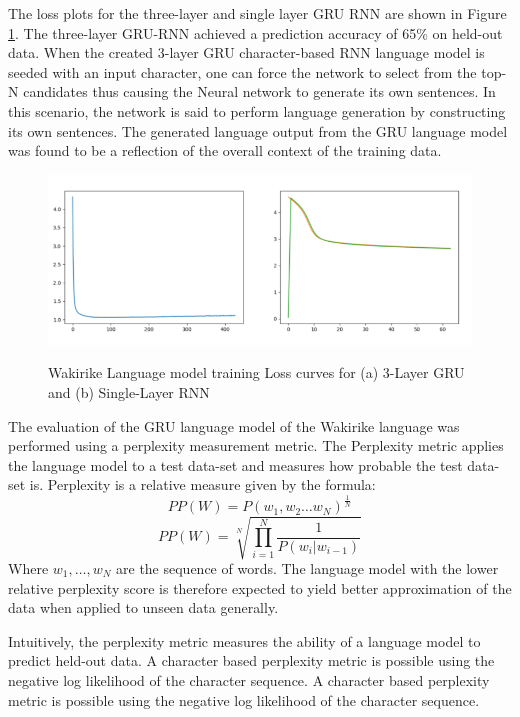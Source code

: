 The loss plots for the three-layer and single layer GRU RNN are shown in Figure \ref{fig_ch7_00losses}.  The three-layer GRU-RNN achieved a prediction accuracy of 65\% on held-out data.  When the created 3-layer GRU character-based RNN language model is seeded with an input character, one can force the network to select from the top-N candidates thus causing the Neural network to generate its own sentences.  In this scenario, the network is said to perform language generation by constructing its own sentences.  The generated language output from the GRU language model was found to be a reflection of the overall context of the training data. 

\begin{figure}
\centering
  \includegraphics[width=14cm]{thesis/images/losses_slgru}\\
  \caption{Wakirike Language model training Loss curves for (a) 3-Layer GRU and (b) Single-Layer RNN} \label{fig_ch7_00losses}
\end{figure}

The evaluation of the GRU language model of the Wakirike language was performed using a perplexity measurement metric. The Perplexity metric applies the language model to a test data-set and measures how probable the test data-set is. Perplexity is a relative measure given by the formula:
%
\begin{equation}
PP(W)=P(w_1,w_2\dots w_N)^\frac{1}{N}
\label{ch5_eq1_ppx}
\end{equation}
%
%
\begin{equation}
PP(W)=\sqrt[N]{\prod_{i=1}^N\frac{1}{P(w_i|w_{i-1})}}
\label{ch5_eq2_ppx}
\end{equation}
%
Where $w_1,\dots,w_N$ are the sequence of words. The language model with the lower relative perplexity score is therefore expected to yield better approximation of the data when applied to unseen data generally.

Intuitively, the perplexity metric measures the ability of a language model to predict held-out data.  A character based perplexity metric is possible using  the negative log likelihood of the character sequence.  A character based perplexity metric is possible using  the negative log likelihood of the character sequence.

